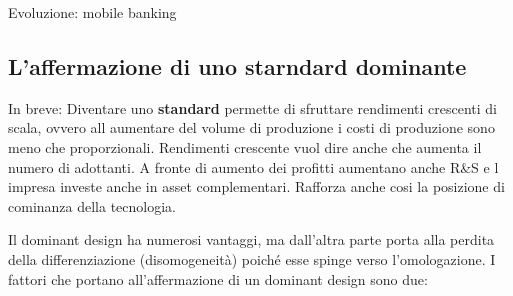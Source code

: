 \documentclass{article}
\begin{document}
Evoluzione: mobile banking

\subsection{L'affermazione di uno starndard dominante}
In breve: Diventare uno \textbf{standard} permette di sfruttare rendimenti crescenti di scala, ovvero all aumentare del volume di produzione i costi di produzione sono meno che proporzionali. Rendimenti crescente vuol dire anche che aumenta il numero di adottanti. A fronte di aumento dei profitti aumentano anche R\&S e l impresa investe anche in asset complementari. Rafforza anche cosi la posizione di cominanza della tecnologia. 

Il dominant design ha numerosi vantaggi, ma dall’altra parte porta alla perdita della
differenziazione (disomogeneità) poiché esse spinge verso l’omologazione. I fattori che portano
all’affermazione di un dominant design sono due:
\end{document}
